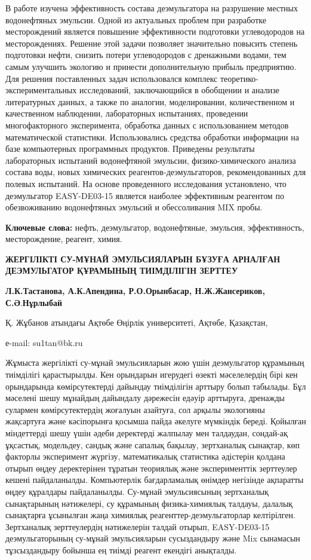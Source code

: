 В работе изучена эффективность состава деэмульгатора на разрушение
местных водонефтяных эмульсии. Одной из актуальных проблем при
разработке месторождений является повышение эффективности подготовки
углеводородов на месторождениях. Решение этой задачи позволяет
значительно повысить степень подготовки нефти, снизить потери
углеводородов с дренажными водами, тем самым улучшить экологию и
принести дополнительную прибыль предприятию. Для решения поставленных
задач использовался комплекс теоретико-экспериментальных исследований,
заключающийся в обобщении и анализе литературных данных, а также по
аналогии, моделировании, количественном и качественном наблюдении,
лабораторных испытаниях, проведении многофакторного эксперимента,
обработка данных с использованием методов математической статистики.
Использовались средства обработки информации на базе компьютерных
программных продуктов. Приведены результаты лабораторных испытаний
водонефтяной эмульсии, физико-химического анализа состава воды, новых
химических реагентов-деэмульгаторов, рекомендованных для полевых
испытаний. На основе проведенного исследования установлено, что
деэмульгатор EASY-DE03-15 является наиболее эффективным реагентом по
обезвоживанию водонефтяных эмульсий и обессоливания MIX пробы.

{\bfseries Ключевые слова:} нефть, деэмульгатор, водонефтяные, эмульсия,
эффективность, месторождение, реагент, химия.

{\bfseries ЖЕРГІЛІКТІ СУ-МҰНАЙ ЭМУЛЬСИЯЛАРЫН БҰЗУҒА АРНАЛҒАН ДЕЭМУЛЬГАТОР
ҚҰРАМЫНЫҢ ТИІМДІЛІГІН ЗЕРТТЕУ}

{\bfseries Л.К.Тастанова, А.К.Апендина, Р.О.Орынбасар, Н.Ж.Жансериков,
С.Ә}.{\bfseries Нұрлыбай}

Қ. Жұбанов атындағы Ақтөбе Өңірлік университеті, Ақтөбе, Қазақстан,

е-mail: su1tan@bk.ru

Жұмыста жергілікті су-мұнай эмульсияларын жою үшін деэмульгатор
құрамының тиімділігі қарастырылды. Кен орындарын игерудегі өзекті
мәселелердің бірі кен орындарында көмірсутектерді дайындау тиімділігін
арттыру болып табылады. Бұл мәселені шешу мұнайдың дайындалу дәрежесін
едәуір арттыруға, дренажды сулармен көмірсутектердің жоғалуын азайтуға,
сол арқылы экологияны жақсартуға және кәсіпорынға қосымша пайда әкелуге
мүмкіндік береді. Қойылған міндеттерді шешу үшін әдеби деректерді
жалпылау мен талдаудан, сондай-ақ ұқсастық, модельдеу, сандық және
сапалық бақылау, зертханалық сынақтар, көп факторлы эксперимент жүргізу,
математикалық статистика әдістерін қолдана отырып өңдеу деректерінен
тұратын теориялық және эксперименттік зерттеулер кешені пайдаланылды.
Компьютерлік бағдарламалық өнімдер негізінде ақпаратты өңдеу құралдары
пайдаланылды. Су-мұнай эмульсиясының зертханалық сынақтарының
нәтижелері, су құрамының физика-химиялық талдауы, далалық сынақтарға
ұсынылған жаңа химиялық реагенттер-деэмульгаторлар келтірілген.
Зертханалық зерттеулердің нәтижелерін талдай отырып, EASY-DE03-15
деэмульгаторының су-мұнай эмульсияларын сусыздандыру және Mix сынамасын
тұзсыздандыру бойынша ең тиімді реагент екендігі анықталды.

